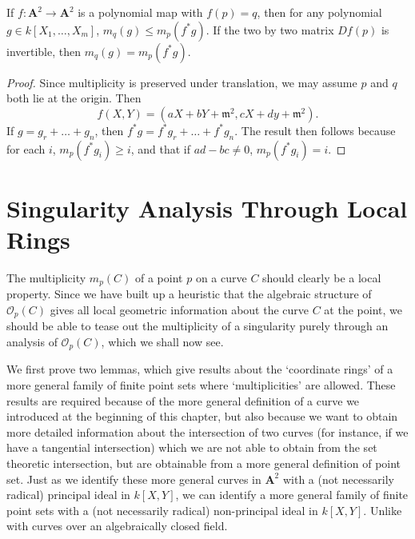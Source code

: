 \begin{prop}
    If $f: \mathbf{A}^2 \to \mathbf{A}^2$ is a polynomial map with $f(p) = q$, then for any polynomial $g \in k[X_1, \dots, X_m]$, $m_q(g) \leq m_p(f^*g)$. If the two by two matrix $Df(p)$ is invertible, then $m_q(g) = m_p(f^* g)$.
\end{prop}
\begin{proof}
    Since multiplicity is preserved under translation, we may assume $p$ and $q$ both lie at the origin. Then
    \[ f(X,Y) = (aX + bY + \mathfrak{m}^2, cX + dy + \mathfrak{m}^2). \]
    If $g = g_r + \dots + g_n$, then $f^*g = f^*g_r + \dots + f^*g_n$. The result then follows because for each $i$, $m_p(f^* g_i) \geq i$, and that if $ad - bc \neq 0$, $m_p(f^* g_i) = i$.
\end{proof}

\section{Singularity Analysis Through Local Rings}

The multiplicity $m_p(C)$ of a point $p$ on a curve $C$ should clearly be a local property. Since we have built up a heuristic that the algebraic structure of $\mathcal{O}_p(C)$ gives all local geometric information about the curve $C$ at the point, we should be able to tease out the multiplicity of a singularity purely through an analysis of $\mathcal{O}_p(C)$, which we shall now see.

We first prove two lemmas, which give results about the `coordinate rings' of a more general family of finite point sets where `multiplicities' are allowed. These results are required because of the more general definition of a curve we introduced at the beginning of this chapter, but also because we want to obtain more detailed information about the intersection of two curves (for instance, if we have a tangential intersection) which we are not able to obtain from the set theoretic intersection, but are obtainable from a more general definition of point set. Just as we identify these more general curves in $\mathbf{A}^2$ with a (not necessarily radical) principal ideal in $k[X,Y]$, we can identify a more general family of finite point sets with a (not necessarily radical) non-principal ideal in $k[X,Y]$. Unlike with curves over an algebraically closed field.


